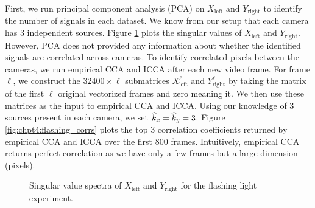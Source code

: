 First, we run principal component analysis (PCA) on $X_{\text{left}}$ and
$Y_{\text{right}}$ to identify the number of signals in each dataset. We know from our
setup that each camera has 3 independent sources. Figure \ref{fig:chpt4:flashing_svs}
plots the singular values of $X_{\text{left}}$ and $Y_{\text{right}}$. However, PCA does
not provided any information about whether the identified signals are correlated across
cameras. To identify correlated pixels between the cameras, we run empirical CCA and ICCA
after each new video frame. For frame $\ell$, we construct the $32400\times\ell$
submatrices $X_{\text{left}}^\ell$ and $Y_{\text{right}}^\ell$ by taking the matrix of the
first $\ell$ original vectorized frames and zero meaning it. We then use these matrices as
the input to empirical CCA and ICCA. Using our knowledge of 3 sources present in each
camera, we set $\widehat{k}_x=\widehat{k}_y=3$. Figure \ref{fig:chpt4:flashing_corrs} plots the top 3
correlation coefficients returned by empirical CCA and ICCA over the first 800
frames. Intuitively, empirical CCA returns perfect correlation as we have only a few
frames but a large dimension (pixels).


\begin{figure}
  \begin{center}
    \caption{Singular value spectra of $X_{\text{left}}$ and $Y_{\text{right}}$ for the
      flashing light experiment.}
    \label{fig:chpt4:flashing_svs}
  \end{center}
\end{figure}


